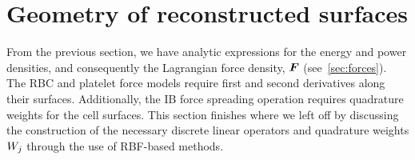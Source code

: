



\section{Geometry of reconstructed surfaces}\label{sec:rbfs}

From the previous section, we have analytic expressions for the energy and power densities, and consequently the
Lagrangian force density, $\boldsymbol{F}$ (see~\ref{sec:forces}).  The RBC and platelet force models require first and second
derivatives along their surfaces.  Additionally, the IB force spreading operation requires quadrature weights for
the cell surfaces. This section finishes where we left off by discussing the construction of the necessary
discrete linear operators and quadrature weights $\weight[j]$ through the use of RBF-based methods.



